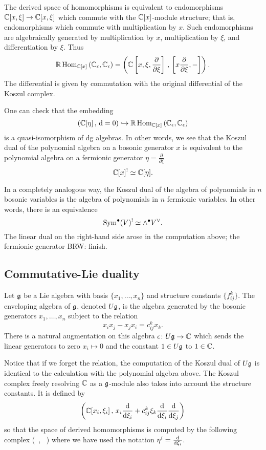 \documentclass[11pt]{amsart}
\def\brian#1{{\textcolor{blue!65!red}{BRW: {#1}}}}
\newcommand{\RHom}{\mathbb{R}\operatorname{Hom}}
\begin{document}
The derived space of homomorphisms is equivalent to endomorphisms $\mathbb C[x, \xi] \to \mathbb C[x,\xi]$ which commute with the $\mathbb C[x]$-module structure; that is, endomorphisms which commute with multiplication by $x$. 
Such endomorphisms are algebraically generated by multiplication by $x$, multiplication by $\xi$, and differentiation by $\xi$. 
Thus
\[
\RHom_{\CC[x]} \left(\CC_\ep, \CC_\ep\right) = \left(\CC\left[x, \xi, \frac{\partial}{\partial \xi} \right] \, , \, \left[x \frac{\partial}{\partial \xi} , -\right] \right) .
\]
The differential is given by commutation with the original differential of the Koszul complex. 

One can check that the embedding 
\[
\left(\CC[\eta] \, , \, \d = 0 \right) \hookrightarrow \RHom_{\CC[x]} \left(\CC_\ep, \CC_\ep\right) 
\]
is a quasi-isomorphism of dg algebras. 
In other words, we see that the Koszul dual of the polynomial algebra on a bosonic generator $x$ is equivalent to the polynomial algebra on a fermionic generator $\eta = \frac{\partial}{\partial \xi}$
\[
\mathbb C[x]^! \simeq \mathbb C[\eta] .
\]

In a completely analogous way, the Koszul dual of the algebra of polynomials in $n$ bosonic variables is the algebra of polynomials in $n$ fermionic variables. 
In other words, there is an equivalence
\[
\operatorname{Sym}^\bullet (V)^! \simeq \wedge^\bullet V^\vee .
\]
The linear dual on the right-hand side arose in the computation above; the fermionic generator \brian{finish}.

\subsection{Commutative-Lie duality}


Let $\mathfrak g$ be a Lie algebra with basis $\{x_1,\ldots, x_n\}$ and structure constants $\{f_{ij}^k\}$. 
The enveloping algebra of $\mathfrak g$, denoted $U \mathfrak g$, is the algebra generated by the bosonic generators $x_1,\ldots,x_n$ subject to the relation 
\[
x_i x_j - x_j x_i = c_{ij}^k x_k .
\]
There is a natural augmentation on this algebra $\epsilon \colon U \mathfrak g \to \mathbb C$ which sends the linear generators to zero $x_i \mapsto 0$ and the constant $1 \in U \mathfrak g$ to $1 \in \mathbb C$. 

Notice that if we forget the relation, the computation of the Koszul dual of $U \mathfrak g$ is identical to the calculation with the polynomial algebra above. 
The Koszul complex freely resolving $\mathbb C$ as a $\mathfrak g$-module also takes into account the structure constants. 
It is defined by
\[
\left(\mathbb C[x_i,\xi_i] \, , \, x_i \frac{{\rm d}}{{\rm d} \xi_i} + c_{ij}^k \xi_k \frac{{\rm d}}{{\rm d} \xi_i}\frac{{\rm d}}{{\rm d} \xi_j}\right) 
\]
so that the space of derived homomorphisms is computed by the following complex 
\beqn
\left(\CC[x_i,\xi_i, \eta^i] \, , \,  \right) 
\eeqn
where we have used the notation $\eta^i = \frac{{\rm d}}{{\rm d} \xi_i}$. 
\end{document}
